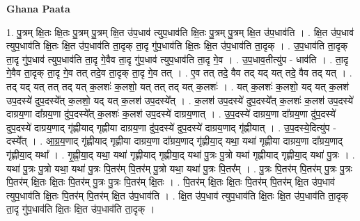 \documentclass[17pt]{extarticle}
\begin{document}
\textbf{Ghana Paata } \newline

1. पु॒त्रम् क्षि॒तः क्षि॒तः पु॒त्रम् पु॒त्रम् क्षि॒त उ॑प॒धाव॑ त्युप॒धाव॑ति क्षि॒तः पु॒त्रम् पु॒त्रम् क्षि॒त उ॑प॒धाव॑ति । . क्षि॒त उ॑प॒धाव॑ त्युप॒धाव॑ति क्षि॒तः क्षि॒त उ॑प॒धाव॑ति ता॒दृक् ता॒दृ गु॑प॒धाव॑ति क्षि॒तः क्षि॒त उ॑प॒धाव॑ति ता॒दृक् । . उ॒प॒धाव॑ति ता॒दृक् ता॒दृ गु॑प॒धाव॑ त्युप॒धाव॑ति ता॒दृ गे॒वैव ता॒दृ गु॑प॒धाव॑ त्युप॒धाव॑ति ता॒दृ गे॒व । . उ॒प॒धाव॒तीत्यु॑प - धाव॑ति । . ता॒दृ गे॒वैव ता॒दृक् ता॒दृ गे॒व तत् तदे॒व ता॒दृक् ता॒दृ गे॒व तत् । . ए॒व तत् तदे॒ वैव तद् यद् यत् तदे॒ वैव तद् यत् । . तद् यद् यत् तत् तद् यत् क॒लशः॑ क॒लशो॒ यत् तत् तद् यत् क॒लशः॑ । . यत् क॒लशः॑ क॒लशो॒ यद् यत् क॒लश॑ उप॒दस्ये॑ दुप॒दस्ये᳚त् क॒लशो॒ यद् यत् क॒लश॑ उप॒दस्ये᳚त् । . क॒लश॑ उप॒दस्ये॑ दुप॒दस्ये᳚त् क॒लशः॑ क॒लश॑ उप॒दस्ये॑ दाग्रय॒णा दा᳚ग्रय॒णा दु॑प॒दस्ये᳚त् क॒लशः॑ क॒लश॑ उप॒दस्ये॑ दाग्रय॒णात् । . उ॒प॒दस्ये॑ दाग्रय॒णा दा᳚ग्रय॒णा दु॑प॒दस्ये॑ दुप॒दस्ये॑ दाग्रय॒णाद् गृ॑ह्णीयाद् गृह्णीया दाग्रय॒णा दु॑प॒दस्ये॑ दुप॒दस्ये॑ दाग्रय॒णाद् गृ॑ह्णीयात् । . उ॒प॒दस्ये॒दित्यु॑प - दस्ये᳚त् । . आ॒ग्र॒य॒णाद् गृ॑ह्णीयाद् गृह्णीया दाग्रय॒णा दा᳚ग्रय॒णाद् गृ॑ह्णीया॒द् यथा॒ यथा॑ गृह्णीया दाग्रय॒णा दा᳚ग्रय॒णाद् गृ॑ह्णीया॒द् यथा᳚ । . गृ॒ह्णी॒या॒द् यथा॒ यथा॑ गृह्णीयाद् गृह्णीया॒द् यथा॑ पु॒त्रः पु॒त्रो यथा॑ गृह्णीयाद् गृह्णीया॒द् यथा॑ पु॒त्रः । . यथा॑ पु॒त्रः पु॒त्रो यथा॒ यथा॑ पु॒त्रः पि॒तर॑म् पि॒तर॑म् पु॒त्रो यथा॒ यथा॑ पु॒त्रः पि॒तर᳚म् । . पु॒त्रः पि॒तर॑म् पि॒तर॑म् पु॒त्रः पु॒त्रः पि॒तर॑म् क्षि॒तः क्षि॒तः पि॒तर॑म् पु॒त्रः पु॒त्रः पि॒तर॑म् क्षि॒तः । . पि॒तर॑म् क्षि॒तः क्षि॒तः पि॒तर॑म् पि॒तर॑म् क्षि॒त उ॑प॒धाव॑ त्युप॒धाव॑ति क्षि॒तः पि॒तर॑म् पि॒तर॑म् क्षि॒त उ॑प॒धाव॑ति । . क्षि॒त उ॑प॒धाव॑ त्युप॒धाव॑ति क्षि॒तः क्षि॒त उ॑प॒धाव॑ति ता॒दृक् ता॒दृ गु॑प॒धाव॑ति क्षि॒तः क्षि॒त उ॑प॒धाव॑ति ता॒दृक् । \newline
\end{document}
